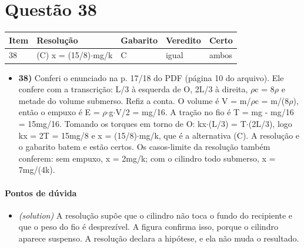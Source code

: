\documentclass{article}%
\begin{document}
\section*{Questão 38}%
\begin{longtable}{@{}p{} p{} p{} p{} p{}@{}}\toprule Item & Resolução & Gabarito & Veredito & Certo \\ \midrule
38 & (C) x = (15/8)$\cdot$mg/k & C & igual & ambos \\
\bottomrule\end{longtable}%
\begin{itemize}%
\item%
\textbf{38)} Conferi o enunciado na p. 17/18 do PDF (página 10 do arquivo). Ele confere com a transcrição: L/3 à esquerda de O, 2L/3 à direita, $\rho$c = 8$\rho$ e metade do volume submerso. Refiz a conta. O volume é V = m/$\rho$c = m/(8$\rho$), então o empuxo é E = $\rho$$\cdot$g$\cdot$V/2 = mg/16. A tração no fio é T = mg - mg/16 = 15mg/16. Tomando os torques em torno de O: kx$\cdot$(L/3) = T$\cdot$(2L/3), logo kx = 2T = 15mg/8 e x = (15/8)$\cdot$mg/k, que é a alternativa (C). A resolução e o gabarito batem e estão certos. Os casos{-}limite da resolução também conferem: sem empuxo, x = 2mg/k; com o cilindro todo submerso, x = 7mg/(4k).%
\end{itemize}%
\paragraph{Pontos de dúvida}%
\begin{itemize}%
\item%
\textit{(solution)} A resolução supõe que o cilindro não toca o fundo do recipiente e que o peso do fio é desprezível. A figura confirma isso, porque o cilindro aparece suspenso. A resolução declara a hipótese, e ela não muda o resultado.%
\end{itemize}%
\end{document}
